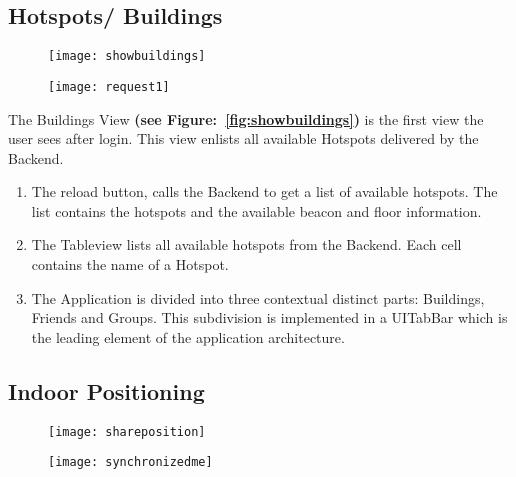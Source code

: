 \subsection{Hotspots/ Buildings}

\begin{figure}
\centering
\begin{minipage}{.5\textwidth}
  \centering
  \texttt{[image: showbuildings]}
  \label{fig:showbuildings}
\end{minipage}%
\begin{minipage}{.5\textwidth}
  \centering
  \texttt{[image: request1]}
  \label{fig:request1}
\end{minipage}
\end{figure}



The Buildings View \textbf{(see Figure:~\ref{fig:showbuildings})} is the first view the user sees after login. This view enlists all available Hotspots delivered by the Backend.

\begin{enumerate}
  \item The reload button, calls the Backend to get a list of available hotspots. The list contains the hotspots and the available beacon and floor information.
  \item The Tableview lists all available hotspots from the Backend. Each cell contains the name of a Hotspot.
  \item The Application is divided into three contextual distinct parts: Buildings, Friends and Groups. This subdivision is implemented in a UITabBar which is the leading element of the application architecture.
\end{enumerate}

\subsection{Indoor Positioning}

\begin{figure}
\centering
\begin{minipage}{.5\textwidth}
  \centering
  \texttt{[image: shareposition]}
  \label{fig:shareposition}
\end{minipage}%
\begin{minipage}{.5\textwidth}
  \centering
  \texttt{[image: synchronizedme]}
  \label{fig:synchronizedme}
\end{minipage}
\end{figure}


